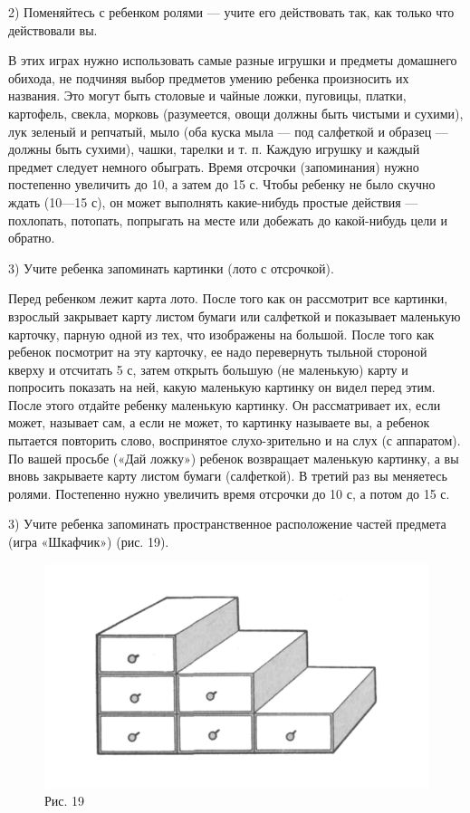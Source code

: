 \documentclass{book}
\begin{document}
2) Поменяйтесь с ребенком ролями --- учите его действовать так, как
только что действовали вы.

В этих играх нужно использовать самые разные игрушки и предметы
домашнего обихода, не подчиняя выбор предметов умению ребенка
произносить их названия. Это могут быть столовые и чайные ложки,
пуговицы, платки, картофель, свекла, морковь (разумеется, овощи должны
быть чистыми и сухими), лук зеленый и репчатый, мыло (оба куска мыла ---
под салфеткой и образец --- должны быть сухими), чашки, тарелки и т. п.
Каждую игрушку и каждый предмет следует немного обыграть. Время отсрочки
(запоминания) нужно постепенно увеличить до 10, а затем до 15 с. Чтобы
ребенку не было скучно ждать (10---15 с), он может выполнять
какие-нибудь простые действия --- похлопать, потопать, попрыгать на
месте или добежать до какой-нибудь цели и обратно.

3) Учите ребенка запоминать картинки (лото с отсрочкой).

Перед ребенком лежит карта лото. После того как он рассмотрит все
картинки, взрослый закрывает карту листом бумаги или салфеткой и
показывает маленькую карточку, парную одной из тех, что изображены на
большой. После того как ребенок посмотрит на эту карточку, ее надо
перевернуть тыльной стороной кверху и отсчитать 5 с, затем открыть
большую (не маленькую) карту и попросить показать на ней, какую
маленькую картинку он видел перед этим. После этого отдайте ребенку
маленькую картинку. Он рассматривает их, если может, называет сам, а
если не может, то картинку называете вы, а ребенок пытается повторить
слово, воспринятое слухо-зрительно и на слух (с аппаратом). По вашей
просьбе («Дай ложку») ребенок возвращает маленькую картинку, а вы вновь
закрываете карту листом бумаги (салфеткой). В третий раз вы меняетесь
ролями. Постепенно нужно увеличить время отсрочки до 10 с, а потом до 15
с.

3) Учите ребенка запоминать пространственное расположение частей
предмета (игра «Шкафчик») (рис. 19).

\begin{figure}
\centering
\includegraphics[width=\linewidth]{media/media/image16.png}
\caption*{Рис. 19}
\end{figure}
\end{document}
